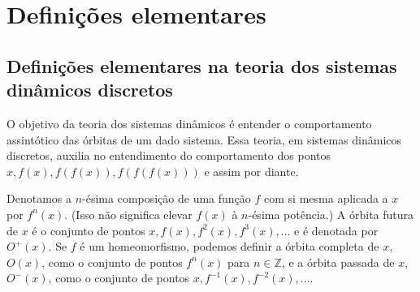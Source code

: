 \documentclass[../IC.tex]{subfiles}
\begin{document}
	\chapter{Definições elementares}
	
	\section{Definições elementares na teoria dos sistemas dinâmicos discretos}
	
	O objetivo da teoria dos sistemas dinâmicos é entender o comportamento assintótico das órbitas de um dado sistema. Essa teoria, em sistemas dinâmicos discretos, auxilia no entendimento do comportamento dos pontos $x, f(x), f(f(x)), f(f(f(x)))$ e assim por diante.
	
	\begin{definicao}
			Denotamos a $n$-ésima composição de uma função $f$ com si mesma aplicada a $x$ por $f^n(x)$. (Isso não significa elevar $f(x)$ à $n$-ésima potência.) A órbita futura de $x$ é o conjunto de pontos $x, f(x), f^2(x), f^3(x), \dots$ e é denotada por $O^+(x)$. Se $f$ é um homeomorfismo, podemos definir a órbita completa de $x$, $O(x)$, como o conjunto de pontos $f^n(x)$ para $n \in \mathbb{Z}$, e a órbita passada de $x$, $O^-(x)$, como o conjunto de pontos $x, f^{-1}(x), f^{-2}(x), \dots$.
	\end{definicao}
\end{document}
